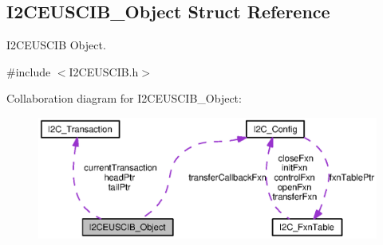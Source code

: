 \subsection{I2\+C\+E\+U\+S\+C\+I\+B\+\_\+\+Object Struct Reference}
\label{struct_i2_c_e_u_s_c_i_b___object}


I2\+C\+E\+U\+S\+C\+I\+B Object.  




{\ttfamily \#include $<$I2\+C\+E\+U\+S\+C\+I\+B.\+h$>$}



Collaboration diagram for I2\+C\+E\+U\+S\+C\+I\+B\+\_\+\+Object\+:
\nopagebreak
\begin{figure}[H]
\begin{center}
\leavevmode
\includegraphics[width=350pt]{struct_i2_c_e_u_s_c_i_b___object__coll__graph}
\end{center}
\end{figure}

